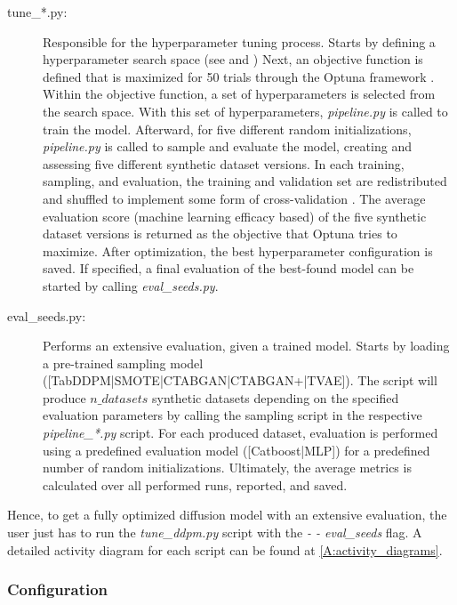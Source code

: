 \begin{description}
    \item[tune\_*.py\footnotemark:]
    Responsible for the hyperparameter tuning process.
    Starts by defining a hyperparameter search space (see \cite[Table 1, p. 4]{kotelnikov2022TabDDPMModellingTabular} and \cite[Table 7-11, p. 13 f.]{kotelnikov2022TabDDPMModellingTabular})
    Next, an objective function is defined that is maximized for 50 trials through the Optuna framework \cite{optuna_2019}.
    Within the objective function, a set of hyperparameters is selected from the search space.
    With this set of hyperparameters, \textit{pipeline.py} is called to train the model.
    Afterward, for five different random initializations, \textit{pipeline.py} is called to sample and evaluate the model, creating and assessing five different synthetic dataset versions.
    In each training, sampling, and evaluation, the training and validation set are redistributed and shuffled to implement some form of cross-validation \cite{kohavi2001StudyCrossValidationBootstrap}.
    The average evaluation score (machine learning efficacy based) of the five synthetic dataset versions is returned as the objective that Optuna tries to maximize.
    After optimization, the best hyperparameter configuration is saved.
    If specified, a final evaluation of the best-found model can be started by calling \textit{eval\_seeds.py}.
    \item[eval\_seeds.py:]
    Performs an extensive evaluation, given a trained model.
    Starts by loading a pre-trained sampling model \\([TabDDPM|SMOTE|CTABGAN|CTABGAN+|TVAE]).
    The script will produce $n\_datasets$ synthetic datasets depending on the specified evaluation parameters by calling the sampling script in the respective \textit{pipeline\_*.py} script.
    For each produced dataset, evaluation is performed using a predefined evaluation model ([Catboost|MLP]) for a predefined number of random initializations.
    Ultimately, the average metrics is calculated over all performed runs, reported, and saved.
\end{description}

Hence, to get a fully optimized diffusion model with an extensive evaluation, the user just has to run the \textit{tune\_ddpm.py} script with the \textit{- - eval\_seeds} flag.
A detailed activity diagram for each script can be found at \autoref{A:activity_diagrams}.

\subsubsection[]{Configuration}

